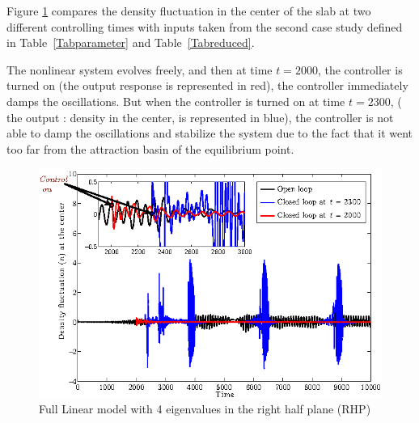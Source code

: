\documentclass[12pt,lot, lof]{puthesis}
\begin{document}
Figure \ref{lqr2} compares the density fluctuation in the center of the slab at two different controlling times with inputs taken from the second case study defined in Table~\ref{Tabparameter} and Table~\ref{Tabreduced}.

The nonlinear system evolves freely, and then at time $t=2000$, the controller is turned on (the output response is represented in red), the controller immediately damps the oscillations.
But when the controller is turned on at time $t=2300$, ( the output : density in the center, is represented in blue),  the controller is not able to damp the oscillations and stabilize the system due to the fact that it went too far from the attraction basin of the equilibrium point.

\begin{figure}[htb]
\centering
  \includegraphics[width=0.7 \linewidth]{fullstate2}
  \caption{Full Linear model with 4 eigenvalues in the right half plane (RHP)}
  \label{lqr2}
\end{figure}
\end{document}
